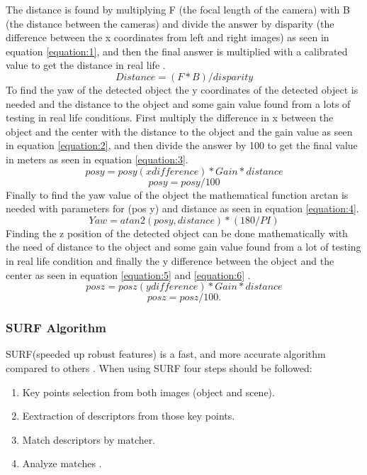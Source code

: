 The distance is found by multiplying F (the focal length of the camera) with B (the distance between the cameras) and divide the answer by disparity (the difference between the x coordinates from left and right images) as seen in equation \ref{equation:1}, and then the final answer is multiplied with a calibrated value to get the distance in real life\cite{Stereo_Camera} \cite{Find_distance}.
\begin{equation}\label{equation:1}
Distance = (F*B)/disparity
\end{equation} 
To find the yaw of the detected object the y coordinates of the detected object is needed and the distance to the object and some gain value found from a lots of testing in real life conditions.
First multiply the difference in x between the object and the center with the distance to the object and the gain value as seen in equation \ref{equation:2}, and then divide the answer by 100 to get the final value in meters as seen in equation \ref{equation:3}.
\begin{equation}\label{equation:2}
pos y= pos y (x difference) * Gain * distance
\end{equation} 
\begin{equation}\label{equation:3}
pos y=pos y/100
\end{equation} 
Finally to find the yaw value of the object the mathematical function arctan is needed with parameters for (pos y) and distance as seen in equation \ref{equation:4}.
\begin{equation}\label{equation:4}
Yaw=atan2 (pos y , distance)*(180/PI)
\end{equation} 
Finding the z position of the detected object  can be done mathematically with the need of distance to the object and some gain value found from a lot of testing in real life condition and finally the y difference between the object and the center as seen in equation \ref{equation:5} and \ref{equation:6} .
\begin{equation}\label{equation:5}
pos z =  pos z  (y difference) *Gain*distance
\end{equation} 
\begin{equation}\label{equation:6}
pos z =  pos z /100.
\end{equation} 

\subsubsection{SURF Algorithm}
 SURF(speeded up robust features)  is a fast, and more accurate algorithm compared to others \cite{SURF_Speed}. When using SURF four steps should be followed:
 \begin{enumerate}
\item Key points selection from both images (object and scene). 
\item Eextraction of descriptors from those key points.
\item Match descriptors by matcher.
\item Analyze  matches \cite{SURF}.
 \end{enumerate}

